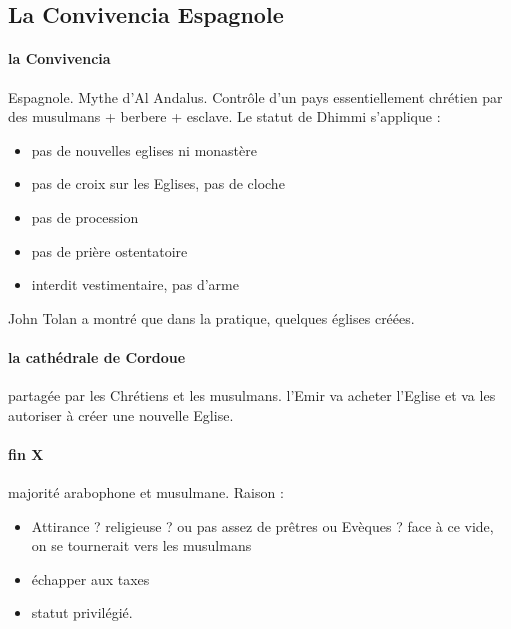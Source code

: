  
\subsection{La Convivencia Espagnole}
\paragraph{la Convivencia} Espagnole. Mythe d'Al Andalus. Contrôle d'un pays essentiellement chrétien par des musulmans + berbere + esclave. Le statut de Dhimmi s'applique : 
\begin{itemize}
    \item pas de nouvelles eglises ni monastère
    \item pas de croix sur les Eglises, pas de cloche
    \item pas de procession
    \item pas de prière ostentatoire
    \item interdit vestimentaire, pas d'arme
\end{itemize}

John Tolan a montré que dans la pratique, quelques églises créées.

\paragraph{la cathédrale de Cordoue} partagée par les Chrétiens et les musulmans. l'Emir va acheter l'Eglise et va les autoriser à créer une nouvelle Eglise. 

\paragraph{fin X} majorité arabophone et musulmane. Raison : 
\begin{itemize}
    \item Attirance ? religieuse ? ou pas assez de prêtres ou Evèques ? face à ce vide, on se tournerait vers les musulmans
    \item échapper aux taxes
    \item statut privilégié. 
\end{itemize}


